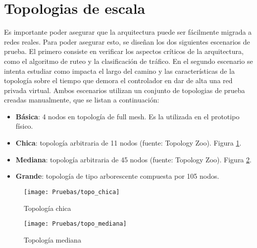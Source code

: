 \section{Topologias de escala}
Es importante poder asegurar que la arquitectura puede ser fácilmente migrada a redes reales. Para poder asegurar esto, se diseñan los dos siguientes escenarios de prueba. El primero consiste en verificar los aspectos críticos de la arquitectura, como el algoritmo de ruteo y la clasificación de tráfico. En el segundo escenario se intenta estudiar como impacta el largo del camino y las características de la topología sobre el tiempo que demora el controlador en dar de alta una red privada virtual. Ambos escenarios utilizan un conjunto de topologias de prueba creadas manualmente, que se listan a continuación:
\begin{itemize}
	\item \textbf{Básica}: 4 nodos en topología de full mesh. Es la utilizada en el prototipo físico.
	\item \textbf{Chica}: topología arbitraria de 11 nodos (fuente: Topology Zoo). Figura \ref{fig:topo_chica}.
	\item \textbf{Mediana}: topología arbitraria de 45 nodos (fuente: Topology Zoo). Figura \ref{fig:topo_mediana}.
	\item \textbf{Grande}: topología de tipo arborescente compuesta por 105 nodos.
\end{itemize}

\begin{figure}[t]
	\caption{Topología chica}
	\texttt{[image: Pruebas/topo\_chica]}
	\centering
	\label{fig:topo_chica}
\end{figure}

\begin{figure}[t]
	\caption{Topología mediana}
	\texttt{[image: Pruebas/topo\_mediana]}
	\centering
	\label{fig:topo_mediana}
\end{figure}

